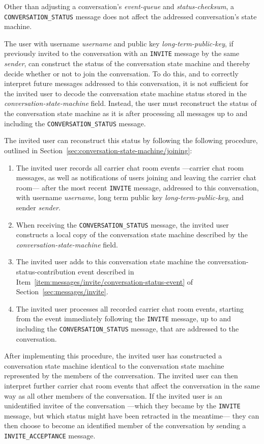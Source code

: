 \documentclass{article}
\def\npmessage#1{\texttt{#1}}
\def\field#1{\textit{#1}}
\def\smfield#1{\textsl{#1}}
\def\type#1{\textsf{#1}}
\begin{document}
Other than adjusting a conversation's \smfield{event-queue} and \smfield{status-checksum}, a \npmessage{CONVERSATION\_STATUS} message does not affect the addressed conversation's state machine.

The user with username \field{username} and public key \field{long-term-public-key}, if previously invited to the conversation with an \npmessage{INVITE} message by the same \field{sender}, can construct the status of the conversation state machine and thereby decide whether or not to join the conversation.
To do this, and to correctly interpret future messages addressed to this conversation, it is not sufficient for the invited user to decode the conversation state machine status stored in the \field{conversation-state-machine} field.
Instead, the user must reconstruct the status of the conversation state machine as it is after processing all messages up to and including the \npmessage{CONVERSATION\_STATUS} message.

The invited user can reconstruct this status by following the following procedure, outlined in Section~\ref{sec:conversation-state-machine/joining}:
\begin{enumerate}
\item The invited user records all carrier chat room events ---carrier chat room messages, as well as notifications of users joining and leaving the carrier chat room--- after the most recent \npmessage{INVITE} message, addressed to this conversation, with username \field{username}, long term public key \field{long-term-public-key}, and sender \field{sender}.
\item When receiving the \npmessage{CONVERSATION\_STATUS} message, the invited user constructs a local copy of the conversation state machine described by the \field{conversation-state-machine} field.
\item The invited user adds to this conversation state machine the \type{conversation-status-contribution} event described in Item~\ref{item:messages/invite/conversation-status-event} of Section~\ref{sec:messages/invite}.
\item The invited user processes all recorded carrier chat room events, starting from the event immediately following the \npmessage{INVITE} message, up to and including the \npmessage{CONVERSATION\_STATUS} message, that are addressed to the conversation.
\end{enumerate}
After implementing this procedure, the invited user has constructed a conversation state machine identical to the conversation state machine represented by the members of the conversation.
The invited user can then interpret further carrier chat room events that affect the conversation in the same way as all other members of the conversation.
If the invited user is an unidentified invitee of the conversation ---which they became by the \npmessage{INVITE} message, but which status might have been retracted in the meantime--- they can then choose to become an identified member of the conversation by sending a \npmessage{INVITE\_ACCEPTANCE} message.
\end{document}
